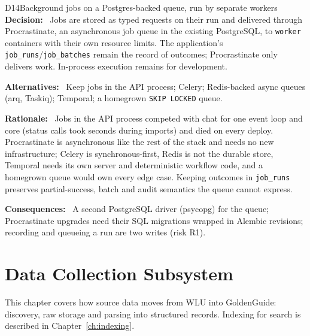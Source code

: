 \documentclass[11pt,letterpaper]{report}
\newcommand{\field}[1]{\textbf{\color{lauPurple}#1:}~}
\begin{document}
\begin{decision}{D14}{Background jobs on a Postgres-backed queue, run by separate workers}
\field{Decision} Jobs are stored as typed requests on their run and delivered through Procrastinate, an
asynchronous job queue in the existing PostgreSQL, to \texttt{worker} containers with their own resource
limits. The application's \texttt{job\_runs}/\texttt{job\_batches} remain the record of outcomes;
Procrastinate only delivers work. In-process execution remains for development.\par
\field{Alternatives} Keep jobs in the API process; Celery; Redis-backed async queues (arq, Taskiq);
Temporal; a homegrown \texttt{SKIP LOCKED} queue.\par
\field{Rationale} Jobs in the API process competed with chat for one event loop and core (status calls
took seconds during imports) and died on every deploy. Procrastinate is asynchronous like the rest of
the stack and needs no new infrastructure; Celery is synchronous-first, Redis is not the durable store,
Temporal needs its own server and deterministic workflow code, and a homegrown queue would own every
edge case. Keeping outcomes in \texttt{job\_runs} preserves partial-success, batch and audit semantics
the queue cannot express.\par
\field{Consequences} A second PostgreSQL driver (psycopg) for the queue; Procrastinate upgrades need
their SQL migrations wrapped in Alembic revisions; recording and queueing a run are two writes (risk R1).
\end{decision}

\chapter{Data Collection Subsystem}\label{ch:collection}
This chapter covers how source data moves from WLU into GoldenGuide: discovery, raw storage and
parsing into structured records. Indexing for search is described in Chapter~\ref{ch:indexing}.
\end{document}
